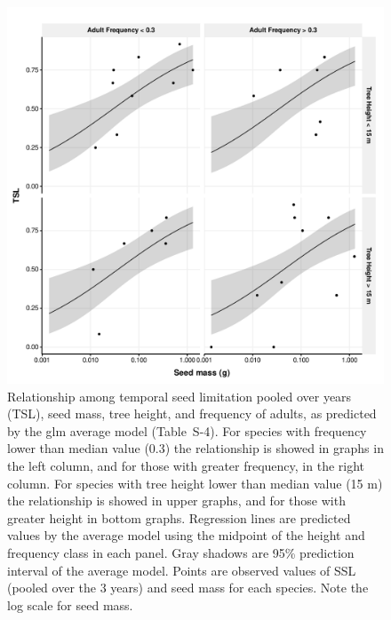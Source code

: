 \documentclass{article}
\begin{document}
\begin{figure}[h!]
  \centering
  \includegraphics[width=\textwidth]{../figures/TSL_all_pred_prob_glm}
  \caption{Relationship among temporal seed limitation pooled over
    years (TSL), seed mass, tree height, and frequency of adults, as
    predicted by the glm average model (Table~S-4). For
    species with frequency lower than median value (0.3) the
    relationship is showed in graphs in the left column, and for those
    with greater frequency, in the right column. For species with tree
    height lower than median value (15 m) the relationship is showed
    in upper graphs, and for those with greater height in bottom
    graphs. Regression lines are predicted values by the average model
    using the midpoint of the height and frequency class in each
    panel. Gray shadows are 95\% prediction interval of the average
    model. Points are observed values of SSL (pooled over the 3 years)
    and seed mass for each species. Note the log scale for seed mass.}
  \label{fig:TSL_glm}
\end{figure}



\end{document}
